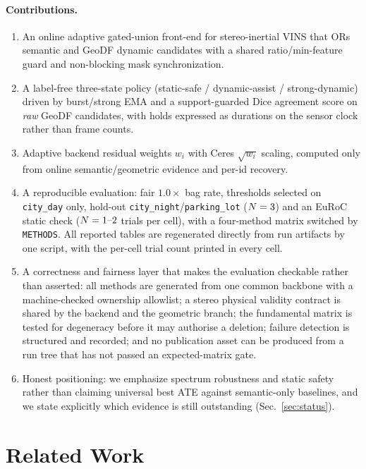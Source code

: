 \documentclass{ieeeaccess}
\begin{document}
\paragraph{Contributions.}
\begin{enumerate}
\item An online adaptive gated-union front-end for stereo-inertial VINS that ORs semantic and GeoDF dynamic candidates with a shared ratio/min-feature guard and non-blocking mask synchronization.
\item A label-free three-state policy (static-safe / dynamic-assist / strong-dynamic) driven by burst/strong EMA and a support-guarded Dice agreement score on \emph{raw} GeoDF candidates, with holds expressed as durations on the sensor clock rather than frame counts.
\item Adaptive backend residual weights \(w_i\) with Ceres \(\sqrt{w_i}\) scaling, computed only from online semantic/geometric evidence and per-id recovery.
\item A reproducible evaluation: fair \(1.0\times\) bag rate, thresholds selected on \texttt{city\_day} only, hold-out \texttt{city\_night}/\texttt{parking\_lot} (\(N=3\)) and an EuRoC static check (\(N=\mbox{1--2}\) trials per cell), with a four-method matrix switched by \texttt{METHODS}. All reported tables are regenerated directly from run artifacts by one script, with the per-cell trial count printed in every cell.
\item A correctness and fairness layer that makes the evaluation checkable rather than asserted: all methods are generated from one common backbone with a machine-checked ownership allowlist; a stereo physical validity contract is shared by the backend and the geometric branch; the fundamental matrix is tested for degeneracy before it may authorise a deletion; failure detection is structured and recorded; and no publication asset can be produced from a run tree that has not passed an expected-matrix gate.
\item Honest positioning: we emphasize spectrum robustness and static safety rather than claiming universal best ATE against semantic-only baselines, and we state explicitly which evidence is still outstanding (Sec.~\ref{sec:status}).
\end{enumerate}

\section{Related Work}
\label{sec:related}
\end{document}
